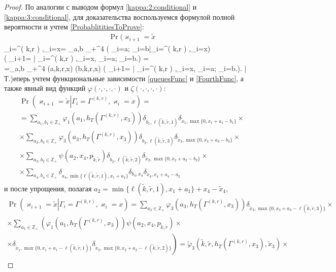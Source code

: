 \documentclass[a4paper,12pt,russian]{extarticle}
\newcommand{\ga}[1]{\Gamma^{\left( #1 \right)} }
\renewcommand{\P}[2]{\Pr\left( #1 \left| #2\right.\right)}
\newcommand{\mll}[1]{\begin{multline*}#1\end{multline*}}
\begin{document}
\begin{proof}
По аналогии с выводом формул \eqref{kappa:2:conditional} и \eqref{kappa:3:conditional}, для доказательства воспользуемся формулой полной вероятности и учтем \eqref{ProbablititiesToProve}:
\mll
{
\Pr (\varkappa_{i+1}=\tilde{x}}{\Gamma_{i}=\ga{k,r},\varkappa_i=x}= \sum_{a,b \in {}_+^4} \P{\eta_i=a; \xi_i=b|\Gamma_{i}=\ga{k,r},\varkappa_i=x)\times \\ 
\times
\P{\varkappa_{i+1}=\tilde{x}}{\Gamma_{i}=\ga{k,r},\varkappa_i=x, \eta_i=a; \xi_i=b} = \\
=\sum_{a,b \in \mathbb{Z}_+^4} \varphi(a,k,r,x) \zeta(b,k,r,x)
\times
\P{\varkappa_{i+1}=\tilde{x}}{\Gamma_{i}=\ga{k,r},\varkappa_i=x, \eta_i=a; \xi_i=b}.
}
Теперь учтем функциональные зависимости \eqref{queuesFunc} и \eqref{FourthFunc}, а также явный вид функций $\varphi(\cdot, \cdot, \cdot, \cdot)$ и $\zeta(\cdot, \cdot, \cdot, \cdot)$:
\mll
{
\P{\varkappa_{i+1}=\tilde{x}}{\Gamma_{i}=\ga{k,r},\varkappa_i=x}= \\
=\sum_{a_1,b_1 \in \mathbb{Z}_+} \varphi_1(a_1,h_T(\ga{{k},{r}},x_3)) \delta_{b_1,\ell(\tilde{k},\tilde{r},1)} \delta_{\tilde{x}_1,\max{\{0,x_1+a_1-b_1\}}} \times \\
\times \sum_{a_3,b_3 \in \mathbb{Z}_+}  \varphi_3(a_3,h_T(\ga{{k},{r}},x_3)) \delta_{b_3,\ell(\tilde{k},\tilde{r},3)}  \delta_{\tilde{x}_3,\max{\{0,x_3+a_3-b_3\}}} \times \\
\times \sum_{a_2,b_2 \in \mathbb{Z}_+}  \psi(a_2,x_4, p_{\tilde{k},\tilde{r}})   \delta_{b_2,\ell(\tilde{k},\tilde{r},2)}   \delta_{\tilde{x}_2,\max{\{0,x_2+a_2-b_2\}}} \times \\
\times \sum_{a_4,b_4 \in \mathbb{Z}_+}  \delta_{a_4,\min{\{\ell(\tilde{k},\tilde{r},1), x_1+a_1}\}}   \delta_{b_4,x_4} \delta_{\tilde{x}_4,x_4+a_4-a_2} 
}
и после упрощения, полагая $a_2 = \min{\{\ell(\tilde{k},\tilde{r},1), x_1+a_1}\} +x_4-\tilde{x}_4$,
\mll
{
\P{\varkappa_{i+1}=\tilde{x}}{\Gamma_{i}=\ga{k,r},\varkappa_i=x}=\sum_{a_3\in \mathbb{Z}_+}  \varphi_3(a_3,h_T(\ga{{k},{r}},x_3))  \delta_{\tilde{x}_3,\max{\{0,x_3+a_3-\ell(\tilde{k},\tilde{r},3)\}}} \times \\
\times\sum_{a_1 \in \mathbb{Z}_+} \left( \varphi_1(a_1,h_T(\ga{{k},{r}},x_3))  \psi(a_2,x_4, p_{\tilde{k},\tilde{r}}) \times \right. \\
\left. \times \delta_{\tilde{x}_1,\max{\{0,x_1+a_1-\ell(\tilde{k},\tilde{r},1)\}}}  \delta_{\tilde{x}_2,\max{\{0,x_2+a_2-\ell(\tilde{k},\tilde{r},2)\}}} \right)
=\tilde{\varphi}_3(\tilde{k},\tilde{r},h_T(\ga{{k},{r}},x_3),\tilde{x}_3) \times\\
}
\end{proof}
\end{document}
